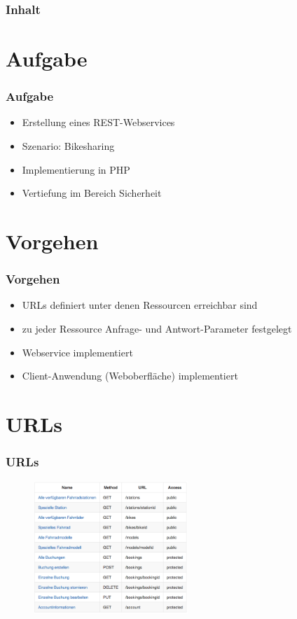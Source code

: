 \begin{frame}
	\frametitle*{Inhalt}
	\tableofcontents
\end{frame}

\section{Aufgabe}
\begin{frame}
	\frametitle*{Aufgabe}
	\begin{itemize}
		\item Erstellung eines REST-Webservices
		\item Szenario: Bikesharing
		\item Implementierung in PHP
		\item Vertiefung im Bereich Sicherheit
	\end{itemize}
\end{frame}

\section{Vorgehen}
\begin{frame}
	\frametitle*{Vorgehen}
	\begin{itemize}
		\item URLs definiert unter denen Ressourcen erreichbar sind
		\item zu jeder Ressource Anfrage- und Antwort-Parameter festgelegt
		\item Webservice implementiert
		\item Client-Anwendung (Weboberfläche) implementiert
	\end{itemize}
\end{frame}

\section{URLs}
\begin{frame}
	\frametitle*{URLs}
	\begin{figure}
		\centering
		\includegraphics[height=50mm]{pics/endpoints.png}
	\end{figure}
\end{frame}

